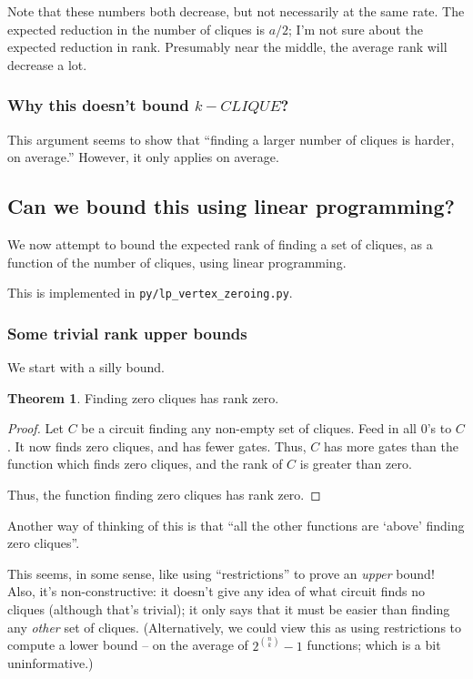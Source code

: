 \documentclass[12pt]{article}
\theoremstyle{definition}
\newtheorem{thm}{Theorem}[section]
\begin{document}
Note that these numbers both decrease, but not necessarily at the same rate.
The expected reduction in the number of cliques is $a/2$; I'm not sure
about the expected reduction in rank. Presumably near the middle, the
average rank will decrease a lot.

\subsubsection{Why this doesn't bound $k-CLIQUE$?}

This argument seems to show that ``finding a larger number of cliques is
harder, on average.'' However, it only applies
on average.

\subsection{Can we bound this using linear programming?}

We now attempt to bound the expected rank of finding a set
of cliques, as a function of the number of cliques, using
linear programming.

This is implemented in
{\tt py/lp\_vertex\_zeroing.py}. 

\subsubsection{Some trivial rank upper bounds}

We start with a silly bound.

\begin{thm}
\label{zeroCliques}
Finding zero cliques has rank zero.
\end{thm}
\begin{proof}

Let $C$ be a circuit finding any non-empty set of cliques.
Feed in all 0's to $C$. It now finds zero cliques, and has
fewer gates. Thus, $C$ has more gates than the function
which finds zero cliques, and the rank of $C$ is greater
than zero.

Thus, the function finding zero cliques has rank zero.

\end{proof}
 
Another way of thinking of this is that ``all the other functions
are `above' finding zero cliques''.

This seems, in some sense, like using ``restrictions'' to prove an {\em upper} bound!
Also, it's non-constructive: it doesn't give any idea of what circuit finds no cliques
(although that's trivial); it only says that it must be easier than finding any
{\em other} set of cliques. (Alternatively, we could view this as using restrictions
to compute a lower bound -- on the average of $2^{n \choose k} - 1$ functions; which
is a bit uninformative.)
\end{document}
